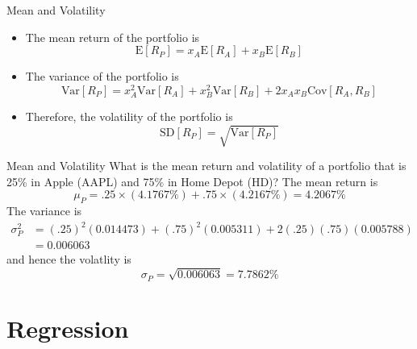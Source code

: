 \documentclass{beamer}
\begin{document}
\begin{frame}{Mean and Volatility}
	\begin{itemize}
		\item The mean return of the portfolio is
		\begin{equation*}
			\text{E}[R_{P}]=x_{A}\text{E}[R_{A}]+x_{B}\text{E}[R_{B}]
		\end{equation*}
		\item The variance of the portfolio is
		\begin{equation*}
			\text{Var}[R_{P}]=x_{A}^{2}\text{Var}[R_{A}]+x_{B}^{2}\text{Var}[R_{B}]+2x_{A}x_{B}\text{Cov}[R_{A},R_{B}]
		\end{equation*}
		\item Therefore, the volatility of the portfolio is
		\begin{equation*}
			\text{SD}[R_{P}]=\sqrt{\text{Var}[R_{P}]}
		\end{equation*}
	\end{itemize}
\end{frame}
\begin{frame}{Mean and Volatility}
	What is the mean return and volatility of a portfolio that is 25\% in Apple (AAPL) and 75\% in Home Depot (HD)?
	\pause
	{\color{blue}
	The mean return is
	\begin{equation*}
		\mu_{P}=.25\times(4.1767\%)+.75\times(4.2167\%)=4.2067\%
	\end{equation*}
	}
	{\color{blue}
	The variance is
	\begin{align*}
		\sigma_{P}^{2}&=(.25)^2(0.014473)+(.75)^2(0.005311)+2(.25)(.75)(0.005788)\\
		&=0.006063
	\end{align*}
	and hence the volatlity is
	\begin{equation}
		\sigma_{P}=\sqrt{0.006063}=7.7862\%
	\end{equation}
	}
\end{frame}

\section{Regression}
\end{document}
